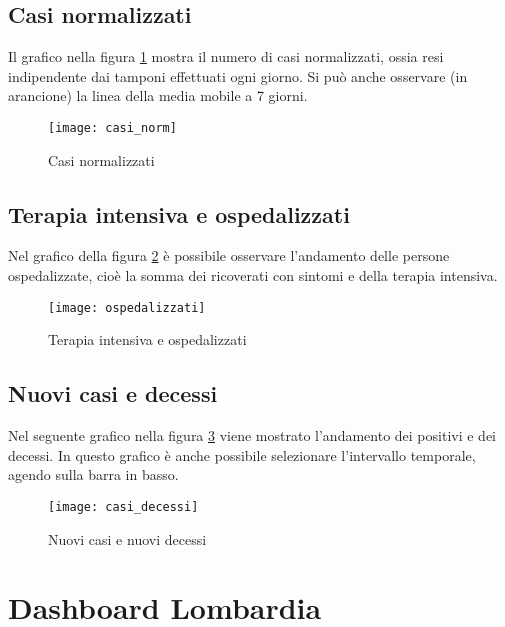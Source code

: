 \subsection{Casi normalizzati}
Il grafico nella figura \ref{fig:casi_normalizzati} mostra il numero di casi normalizzati, ossia resi indipendente dai tamponi effettuati ogni giorno.
Si può anche osservare (in arancione) la linea della media mobile a 7 giorni.
\begin{figure}[htp]
    \centering
    \texttt{[image: casi\_norm]}
    \caption{Casi normalizzati}
    \label{fig:casi_normalizzati}
\end{figure}

\subsection{Terapia intensiva e ospedalizzati}
Nel grafico della figura \ref{fig:ti_ospdedalizzati} è possibile osservare l'andamento delle persone ospedalizzate, cioè la somma dei ricoverati con sintomi e della terapia intensiva.
\begin{figure}[htp]
    \centering
    \texttt{[image: ospedalizzati]}
    \caption{Terapia intensiva e ospedalizzati}
    \label{fig:ti_ospdedalizzati}
\end{figure}


\subsection{Nuovi casi e decessi}
Nel seguente grafico nella figura \ref{fig:casi_decessi} viene mostrato l'andamento dei positivi e dei decessi.
In questo grafico è anche possibile selezionare l'intervallo temporale, agendo sulla barra in basso.
\begin{figure}[htp]
    \centering
    \texttt{[image: casi\_decessi]}
    \caption{Nuovi casi e nuovi decessi}
    \label{fig:casi_decessi}
\end{figure}

\section{Dashboard Lombardia}

\subsection{}
\subsection{}
